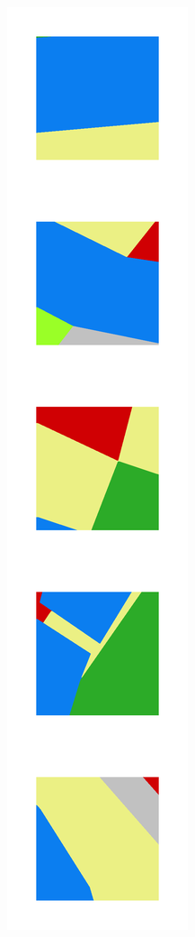\begin{figure}[h]
\begin{subfigure}{\UnetPredictionsImageWidth}
        \caption{}
        \label{fig:unet_pred_original}
    \end{subfigure} \hspace{2mm}
    \begin{subfigure}{\UnetPredictionsImageWidth}
        \includegraphics[width=\textwidth]{images/unet/labels}

\end{subfigure}
\end{figure}
